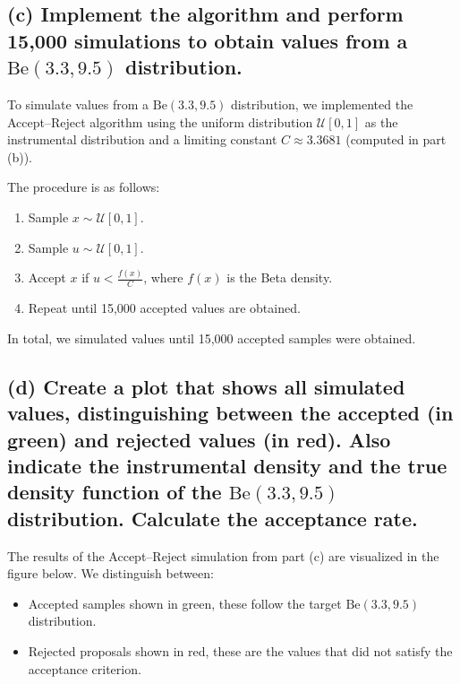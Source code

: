 

\subsection*{(c) Implement the algorithm and perform 15,000 simulations to obtain values from a $\text{Be}(3.3, 9.5)$ distribution.}

To simulate values from a $\text{Be}(3.3, 9.5)$ distribution, we implemented the Accept–Reject algorithm using the uniform distribution $\mathcal{U}[0, 1]$ as the instrumental distribution and a limiting constant $C \approx 3.3681$ (computed in part (b)).

The procedure is as follows:
\begin{enumerate}
    \item Sample $x \sim \mathcal{U}[0, 1]$.
    \item Sample $u \sim \mathcal{U}[0, 1]$.
    \item Accept $x$ if $u < \frac{f(x)}{C}$, where $f(x)$ is the Beta density.
    \item Repeat until 15,000 accepted values are obtained.
\end{enumerate}

In total, we simulated values until 15,000 accepted samples were obtained.

\newpage
\subsection*{(d) Create a plot that shows all simulated values, distinguishing between the accepted (in green) and rejected values (in red). Also indicate the instrumental density and the true density function of the $\text{Be}(3.3, 9.5)$ distribution. Calculate the acceptance rate.}

The results of the Accept–Reject simulation from part (c) are visualized in the figure below. We distinguish between:
\begin{itemize}
    \item Accepted samples shown in green, these follow the target $\text{Be}(3.3, 9.5)$ distribution.
    \item Rejected proposals shown in red, these are the values that did not satisfy the acceptance criterion.
\end{itemize}


